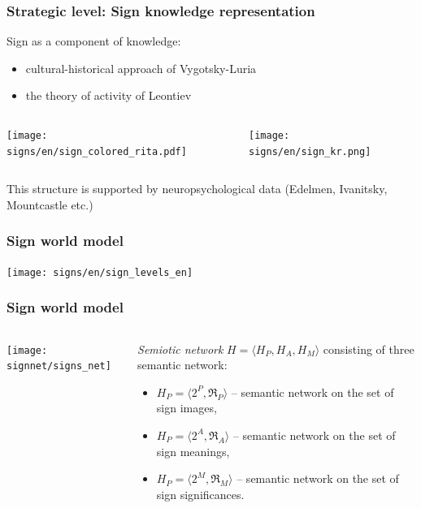 \documentclass[default]{beamer}
\begin{document}
	\begin{frame}
		\frametitle{Strategic level: Sign knowledge representation}
		\small
		Sign as a component of knowledge:
		\begin{itemize}
			\item cultural-historical approach of Vygotsky-Luria
			\item the theory of activity of Leontiev
		\end{itemize}
		
		\begin{columns}
			\begin{column}{0.4\textwidth}
				\centering
				\texttt{[image: signs/en/sign\_colored\_rita.pdf]}
			\end{column}
			\begin{column}{0.6\textwidth}
				\centering
				\texttt{[image: signs/en/sign\_kr.png]}
			\end{column}
		\end{columns}
		
		This structure is supported by neuropsychological data (Edelmen, Ivanitsky, Mountcastle etc.)
		\nocite{*}
		\printbibliography[keyword={nerosign}, resetnumbers=true]
		
	\end{frame}

	\begin{frame}
		\frametitle{Sign world model}
		\centering
		\texttt{[image: signs/en/sign\_levels\_en]}
		
		\nocite{*}
		\printbibliography[keyword={swm}, resetnumbers=true]
	\end{frame}				
		
	\begin{frame}
		\frametitle{Sign world model}
		
		\begin{columns}
			\begin{column}{0.55\textwidth}
				\texttt{[image: signnet/signs\_net]}
			\end{column}
			\begin{column}{0.45\textwidth}
				\textit{Semiotic network} $H=\langle H_P, H_A, H_M\rangle$ consisting of three semantic network: 
				\begin{itemize}
					\item $H_P=\langle2^P,\mathfrak R_P\rangle$ -- semantic network on the set of sign images,
					\item $H_P=\langle2^A,\mathfrak R_A\rangle$ -- semantic network on the set of sign meanings,
					\item $H_P=\langle2^M,\mathfrak R_M\rangle$ -- semantic network on the set of sign significances.
				\end{itemize}
				\nocite{*}
				\printbibliography[keyword={osipov}, resetnumbers=true]
			\end{column}
		\end{columns}
	\end{frame}				
\end{document}
